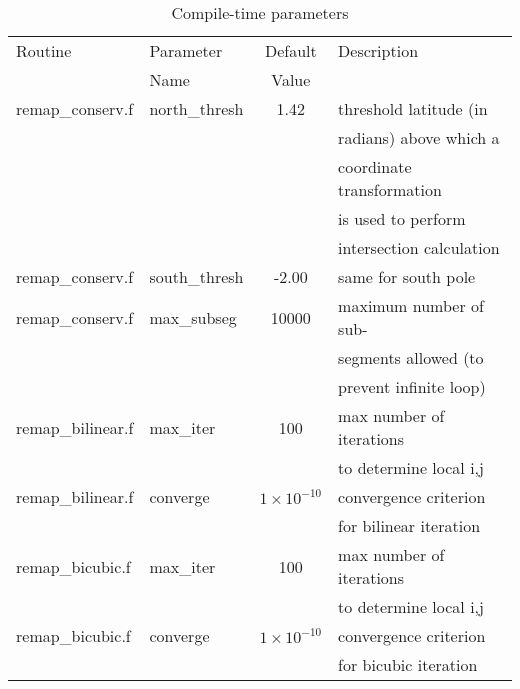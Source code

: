 \documentclass[12pt]{report}
\begin{document}
\begin{table}
\caption{Compile-time parameters \label{tab:params}}

\begin{tabular}{|l|l|c|l|} \hline
     Routine       &    Parameter     &  Default & Description  \\
                   &      Name        &   Value  &              \\ \hline
remap\_conserv.f   &  north\_thresh   &   1.42   &  threshold latitude (in  \\
                   &                  &          &  radians) above which a  \\
                   &                  &          &  coordinate transformation \\
                   &                  &          &  is used to perform       \\
                   &                  &          &  intersection calculation \\ \hline
remap\_conserv.f   &  south\_thresh   &  -2.00   &  same for south pole \\ \hline
remap\_conserv.f   &  max\_subseg     &  10000   &  maximum number of sub-  \\
                   &                  &          &  segments allowed (to    \\
                   &                  &          &  prevent infinite loop)  \\
\hline
remap\_bilinear.f  &  max\_iter       &   100    &  max number of iterations \\
                   &                  &          &  to determine local i,j   \\ \hline
remap\_bilinear.f  &  converge        & $1\times 10^{-10}$
                                                 &  convergence criterion   \\
                   &                  &          &  for bilinear iteration  \\
\hline
remap\_bicubic.f   &  max\_iter       &   100    &  max number of iterations \\
                   &                  &          &  to determine local i,j   \\ \hline
remap\_bicubic.f   &  converge        & $1\times 10^{-10}$
                                                 &  convergence criterion   \\
                   &                  &          &  for bicubic iteration  \\

\end{tabular}
\end{table}
\end{document}
